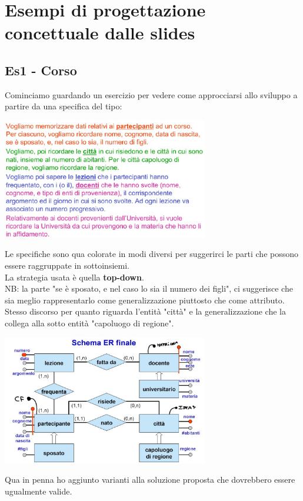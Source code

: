 \section{Esempi di progettazione concettuale dalle slides}
\subsection{Es1 - Corso}
Cominciamo guardando un esercizio per vedere come approcciarsi allo sviluppo a partire da una specifica del tipo:
\begin{center}
    \includegraphics[width=0.675\textwidth]{chaptersLezioniSara/img/ER_es2corso_specifiche2.jpg}
\end{center}
Le specifiche sono qua colorate in modi diversi per suggerirci le parti che possono essere raggruppate in sottoinsiemi.
\\La strategia usata è quella \textbf{top-down}.
\\NB: la parte "se è sposato, e nel caso lo sia il numero dei figli", ci suggerisce che sia meglio rappresentarlo come generalizzazione piuttosto che come attributo. Stesso discorso per quanto riguarda l'entità "città" e la generalizzazione che la collega alla sotto entità "capoluogo di regione".
\begin{center}
    \includegraphics[width=0.675\textwidth]{chaptersLezioniSara/img/ER_es2corso_soluzioni1.jpg}
\end{center}
Qua in penna ho aggiunto varianti alla soluzione proposta che dovrebbero essere ugualmente valide.

